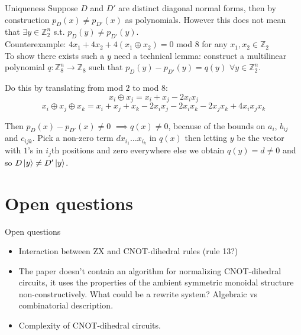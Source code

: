 \documentclass{beamer}
\theoremstyle{definition}
\begin{document}
\begin{frame}{Uniqueness}
Suppose $D$ and $D'$ are distinct diagonal normal forms, then by construction $p_D(x) \neq p_{D'}(x)$ as polynomials. However this does not mean that $\exists y \in \mathbb{Z}_2^n$ s.t. $p_D(y) \neq p_{D'}(y)$.\\

Counterexample: $4x_1 + 4x_2 + 4(x_1 \oplus x_2) = 0$ mod $8$ for any $x_1, x_2 \in \mathbb{Z}_2$\\

To show there exists such a $y$ need a technical lemma: construct a multilinear polynomial $q : \mathbb{Z}_8^n \rightarrow \mathbb{Z}_8$ such that $p_D(y)- p_{D'}(y) = q(y)$ $\forall y \in \mathbb{Z}_2^n$.

Do this by translating from mod $2$ to mod $8$:
$$ x_i \oplus x_j = x_i + x_j -2x_ix_j $$
$$ x_i \oplus x_j \oplus x_k = x_i + x_j + x_k -2x_ix_j -2x_ix_k -2x_jx_k + 4x_ix_jx_k$$

Then $p_D(x) - p_{D'}(x) \neq 0$ $\implies q(x) \neq 0$, because of the bounds on $a_i$, $b_{ij}$ and $c_{ijk}$. Pick a non-zero term $d x_{i_1} \dots x_{i_k}$ in $q(x)$ then letting $y$ be the vector with $1$'s in $i_j$th positions and zero everywhere else we obtain $q(y) = d \neq 0$ and so $D\ket{y} \neq D' \ket{y}$.
\end{frame}

\section{Open questions}
\begin{frame}{Open questions}
	\begin{itemize}
		\item Interaction between ZX and CNOT-dihedral rules (rule 13?)
		\item The paper doesn't contain an algorithm for normalizing CNOT-dihedral circuits, it uses the properties of the ambient symmetric monoidal structure non-constructively. What could be a rewrite system? Algebraic vs combinatorial description.
		\item Complexity of CNOT-dihedral circuits.
	\end{itemize}
\end{frame}
\end{document}
